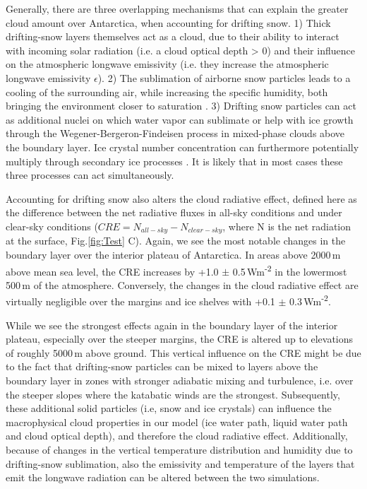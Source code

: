 \documentclass[draft]{agujournal2019}
\begin{document}
Generally, there are three overlapping mechanisms that can explain the greater cloud amount over Antarctica, when accounting for drifting snow. 1) Thick drifting-snow layers themselves act as a cloud, due to their ability to interact with incoming solar radiation (i.e. a cloud optical depth > 0) and their influence on the atmospheric longwave emissivity (i.e. they increase the atmospheric longwave emissivity $\epsilon$). 2) The sublimation of airborne snow particles leads to a cooling of the surrounding air, while increasing the specific humidity, both bringing the environment closer to saturation \cite{Amory2019}. 3) Drifting snow particles can act as additional nuclei on which water vapor can sublimate or help with ice growth through the Wegener-Bergeron-Findeisen process in mixed-phase clouds above the boundary layer. Ice crystal number concentration can furthermore potentially multiply through secondary ice processes \cite{Soti2020}. It is likely that in most cases these three processes can act simultaneously. 

Accounting for drifting snow also alters the cloud radiative effect, defined here as the difference between the net radiative fluxes in all-sky conditions and under clear-sky conditions ($CRE= N_{all-sky} - N_{clear-sky}$, where N is the net radiation at the surface, Fig.\ref{fig:Test} C). Again, we see the most notable changes in the boundary layer over the interior plateau of Antarctica. In areas above 2000\,m above mean sea level, the CRE increases by +1.0 $\pm$ 0.5\,Wm\textsuperscript{-2} in the lowermost 500\,m of the atmosphere. Conversely, the changes in the cloud radiative effect are virtually negligible over the margins and ice shelves with +0.1 $\pm$ 0.3\,Wm\textsuperscript{-2}.

While we see the strongest effects again in the boundary layer of the interior plateau, especially over the steeper margins, the CRE is altered up to elevations of roughly 5000\,m above ground. This vertical influence on the CRE might be due to the fact that drifting-snow particles can be mixed to layers above the boundary layer in zones with stronger adiabatic mixing and turbulence, i.e. over the steeper slopes where the katabatic winds are the strongest. Subsequently, these additional solid particles (i.e, snow and ice crystals) can influence the macrophysical cloud properties in our model (ice water path, liquid water path and cloud optical depth), and therefore the cloud radiative effect. Additionally, because of changes in the vertical temperature distribution and humidity due to drifting-snow sublimation, also the emissivity and temperature of the layers that emit the longwave radiation can be altered between the two simulations.
\end{document}
